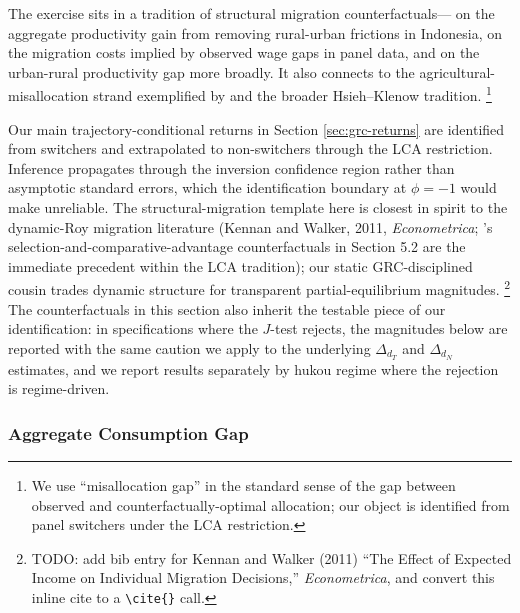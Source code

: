 The exercise sits in a tradition of structural migration counterfactuals---\cite{bryanAggregateProductivityEffects2019} on the aggregate productivity gain from removing rural-urban frictions in Indonesia, \cite{lagakosMigrationCostsObservational2020} on the migration costs implied by observed wage gaps in panel data, and \cite{lagakosUrbanRuralGapsDeveloping2020a} on the urban-rural productivity gap more broadly.
It also connects to the agricultural-misallocation strand exemplified by \cite{adamopoulosMisallocationSelectionProductivity2022} and the broader Hsieh--Klenow tradition.%
\footnote{We use ``misallocation gap'' in the standard sense of the gap between observed and counterfactually-optimal allocation; our object is identified from panel switchers under the LCA restriction.}

Our main trajectory-conditional returns in Section \ref{sec:grc-returns} are identified from switchers and extrapolated to non-switchers through the LCA restriction.
Inference propagates through the inversion confidence region rather than asymptotic standard errors, which the identification boundary at $\phi = -1$ would make unreliable.
The structural-migration template here is closest in spirit to the dynamic-Roy migration literature (Kennan and Walker, 2011, \emph{Econometrica}; \cite{suriSelectionComparativeAdvantage2011}'s selection-and-comparative-advantage counterfactuals in Section 5.2 are the immediate precedent within the LCA tradition); our static GRC-disciplined cousin trades dynamic structure for transparent partial-equilibrium magnitudes.%
\footnote{TODO: add bib entry for Kennan and Walker (2011) ``The Effect of Expected Income on Individual Migration Decisions,'' \emph{Econometrica}, and convert this inline cite to a \texttt{\textbackslash cite\{\}} call.}
The counterfactuals in this section also inherit the testable piece of our identification: in specifications where the $J$-test rejects, the magnitudes below are reported with the same caution we apply to the underlying $\Delta_{d_T}$ and $\Delta_{d_N}$ estimates, and we report results separately by hukou regime where the rejection is regime-driven.

\subsubsection{Aggregate Consumption Gap}\label{sec:misallocation}

